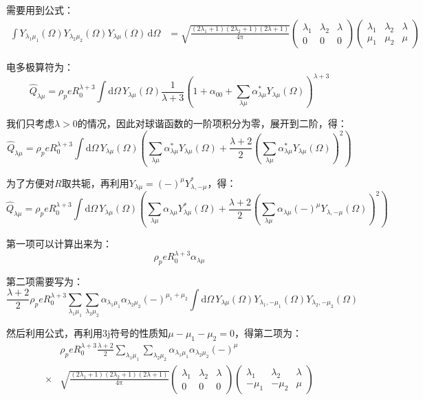 \begin{booknote*}
需要用到公式：
\begin{align*}
\int Y_{\lambda_{1}\mu_{1}}(\Omega)Y_{\lambda_{2}\mu_{2}}(\Omega)Y_{\lambda\mu}(\Omega)\,\mathrm{d}\Omega & =\sqrt{\frac{(2\lambda_{1}+1)(2\lambda_{2}+1)(2\lambda+1)}{4\mathrm{\pi}}}\begin{pmatrix}\lambda_{1} & \lambda_{2} & \lambda\\
0 & 0 & 0
\end{pmatrix}\begin{pmatrix}\lambda_{1} & \lambda_{2} & \lambda\\
\mu_{1} & \mu_{2} & \mu
\end{pmatrix}
\end{align*}

电多极算符为：
\[
\hat{Q}_{\lambda\mu}=\rho_{p}eR^{\lambda+3}_{0}\int\mathrm{d}\Omega\,Y_{\lambda\mu}(\Omega)\frac{1}{\lambda+3}\left(1+\alpha_{00}+\sum_{\lambda\mu}\alpha^{*}_{\lambda\mu}Y_{\lambda\mu}(\Omega)\right)^{\lambda+3}
\]

我们只考虑$\lambda>0$的情况，因此对球谐函数的一阶项积分为零，展开到二阶，得：
\[
\hat{Q}_{\lambda\mu}=\rho_{p}eR^{\lambda+3}_{0}\int\mathrm{d}\Omega\,Y_{\lambda\mu}(\Omega)\left(\sum_{\lambda\mu}\alpha^{*}_{\lambda\mu}Y_{\lambda\mu}(\Omega)+\frac{\lambda+2}{2}\left(\sum_{\lambda\mu}\alpha^{*}_{\lambda\mu}Y_{\lambda\mu}(\Omega)\right)^{2}\right)
\]

为了方便对$R$取共轭，再利用$Y_{\lambda\mu}=(-)^{\mu}Y^{*}_{\lambda,-\mu}$，得：
\[
\hat{Q}_{\lambda\mu}=\rho_{p}eR^{\lambda+3}_{0}\int\mathrm{d}\Omega\,Y_{\lambda\mu}(\Omega)\left(\sum_{\lambda\mu}\alpha_{\lambda\mu}Y^{*}_{\lambda\mu}(\Omega)+\frac{\lambda+2}{2}\left(\sum_{\lambda\mu}\alpha_{\lambda\mu}(-)^{\mu}Y_{\lambda,-\mu}(\Omega)\right)^{2}\right)
\]

第一项可以计算出来为：
\[
\rho_{p}eR^{\lambda+3}_{0}\alpha_{\lambda\mu}
\]

第二项需要写为：
\[
\frac{\lambda+2}{2}\rho_{p}eR^{\lambda+3}_{0}\sum_{\lambda_{1}\mu_{1}}\sum_{\lambda_{2}\mu_{2}}\alpha_{\lambda_{1}\mu_{1}}\alpha_{\lambda_{2}\mu_{2}}(-)^{\mu_{1}+\mu_{2}}\int\mathrm{d}\Omega\,Y_{\lambda\mu}(\Omega)Y_{\lambda_{1},-\mu_{1}}(\Omega)Y_{\lambda_{2},-\mu_{2}}(\Omega)
\]

然后利用公式，再利用3j符号的性质知$\mu-\mu_{1}-\mu_{2}=0$，得第二项为：
\begin{align*}
 & \rho_{p}eR^{\lambda+3}_{0}\frac{\lambda+2}{2}\sum_{\lambda_{1}\mu_{1}}\sum_{\lambda_{2}\mu_{2}}\alpha_{\lambda_{1}\mu_{1}}\alpha_{\lambda_{2}\mu_{2}}(-)^{\mu}\\
\times & \sqrt{\frac{(2\lambda_{1}+1)(2\lambda_{2}+1)(2\lambda+1)}{4\mathrm{\pi}}}\begin{pmatrix}\lambda_{1} & \lambda_{2} & \lambda\\
0 & 0 & 0
\end{pmatrix}\begin{pmatrix}\lambda_{1} & \lambda_{2} & \lambda\\
-\mu_{1} & -\mu_{2} & \mu
\end{pmatrix}
\end{align*}


\end{booknote*}
